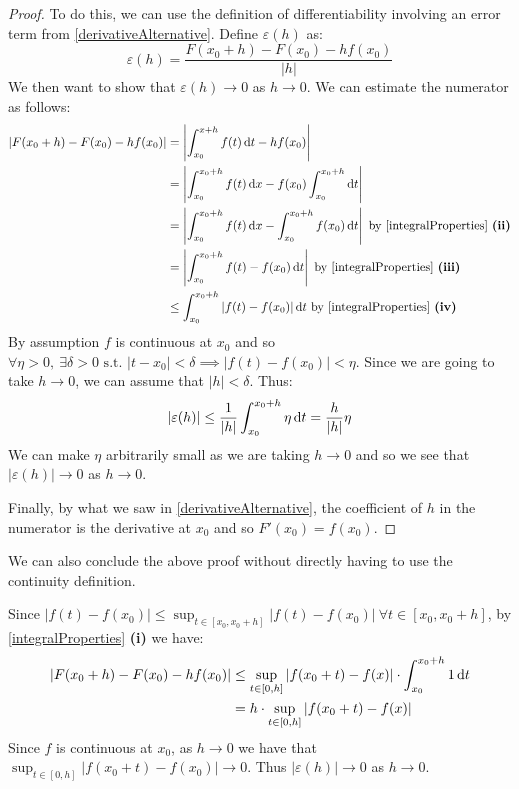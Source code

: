 \documentclass[../main.tex]{subfiles}
\begin{document}
\begin{proof}
  To do this, we can use the definition of differentiability involving an error term from \cref{derivativeAlternative}.
  Define $\varepsilon(h)$ as:
  \[
    \varepsilon(h) = \frac{F(x_0 + h) - F(x_0) - hf(x_0)}{|h|}
  \]
  We then want to show that $\varepsilon(h) \to 0$ as $h \to 0$.
  We can estimate the numerator as follows:
  \begin{align*}
    |F(x_0 + h) - F(x_0) - hf(x_0)| &= \abs{\int_{x_0}^{x + h} f(t) \d{t} - h f(x_0)} \\
                                    &= \abs{\int_{x_0}^{x_0+h} f(t) \d{x} - f(x_0)\int_{x_0}^{x_0+h} \d{t}} \\
                                    &= \abs{\int_{x_0}^{x_0+h} f(t) \d{x} - \int_{x_0}^{x_0+h} f(x_0) \d{t}} \text{ by \cref{integralProperties} \textbf{(ii)}}\\
                                    &= \abs{\int_{x_0}^{x_0+h} f(t) - f(x_0) \d{t}} \text{ by \cref{integralProperties} \textbf{(iii)}} \\
                                    &\leq \int_{x_0}^{x_0+h} |f(t) - f(x_0)| \d{t} \text{ by \cref{integralProperties} \textbf{(iv)}}
  \end{align*}
  By assumption $f$ is continuous at $x_0$ and so $\forall \eta > 0,\ \exists \delta > 0 \text{ s.t. } |t - x_0| < \delta \implies |f(t) - f(x_0)| < \eta$.
  Since we are going to take $h \to 0$, we can assume that $|h| < \delta$.
  Thus:
  \[
    |\varepsilon(h)| \leq \frac{1}{|h|} \int_{x_0}^{x_0 + h} \eta \d{t} = \frac{h}{|h|} \eta
  \]
  We can make $\eta$ arbitrarily small as we are taking $h \to 0$ and so we see that $|\varepsilon(h)| \to 0$ as $h \to 0$.

  Finally, by what we saw in \cref{derivativeAlternative}, the coefficient of $h$ in the numerator is the derivative at $x_0$ and so $F'(x_0) = f(x_0)$.
\end{proof}
\begin{remark}
  We can also conclude the above proof without directly having to use the continuity definition.

  Since $|f(t) - f(x_0)| \leq \sup_{t \in [x_0, x_0 + h]} |f(t) - f(x_0)|\ \forall t \in [x_0, x_0 + h]$, by \cref{integralProperties} \textbf{(i)} we have:
  \begin{align*}
    |F(x_0 + h) - F(x_0) - hf(x_0)| &\leq \sup_{t \in [0, h]}|f(x_0 + t) - f(x)| \cdot \int_{x_0}^{x_0 + h} 1 \d{t} \\
                                    &= h \cdot \sup_{t \in [0, h]} |f(x_0 + t) - f(x)|
  \end{align*}
  Since $f$ is continuous at $x_0$, as $h \to 0$ we have that $\sup_{t \in [0, h]} |f(x_0 + t) - f(x_0)| \to 0$.
  Thus $|\varepsilon(h)| \to 0$ as $h \to 0$.
\end{remark}
\end{document}
